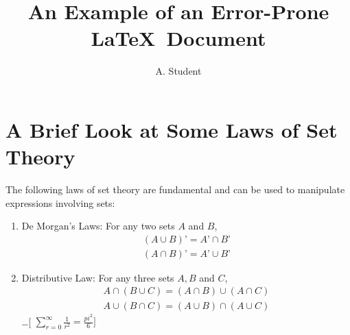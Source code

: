 \documentclass[a4paper]{article}
\title{An Example of an Error-Prone \LaTeX\ Document}
\author{A. Student}
\begin{document}
\maketitle
\section{A Brief Look at Some Laws of Set Theory} The following laws of set theory are
fundamental and can be used to manipulate expressions involving sets:
\begin{enumerate}
\item De Morgan’s Laws: For any two sets $A$ and $B$,
\begin{eqnarray*}
(A\cup B)’ = A’\cap B’ \\
(A\cap B)’ = A’\cup B’
\end{eqnarray*}
\item Distributive Law: For any three sets $A,B$ and $C$,
\begin{eqnarray}
A\cap(B\cup C) = (A\cap B) \cup (A\cap C) \\
A\cup(B\cap C) = (A\cup B) \cap (A\cup C)
\end{eqnarray}
\ldots[
$\sum\limits_{r=0}^\infty \frac{1}{r^2}=\frac{pi^2}{6}
]$
\end{enumerate}
\end{document}
